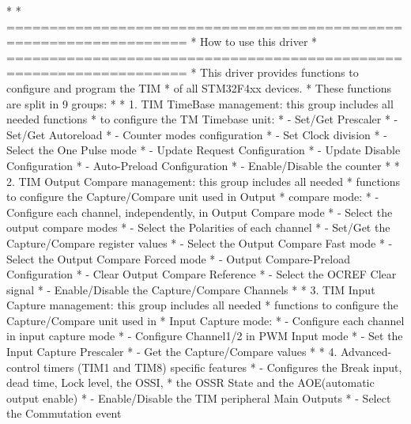 \begin{DoxyVerb}*  
*          ===================================================================
*                                 How to use this driver
*          ===================================================================
*          This driver provides functions to configure and program the TIM 
*          of all STM32F4xx devices.
*          These functions are split in 9 groups: 
*   
*          1. TIM TimeBase management: this group includes all needed functions 
*             to configure the TM Timebase unit:
*                   - Set/Get Prescaler
*                   - Set/Get Autoreload  
*                   - Counter modes configuration
*                   - Set Clock division  
*                   - Select the One Pulse mode
*                   - Update Request Configuration
*                   - Update Disable Configuration
*                   - Auto-Preload Configuration 
*                   - Enable/Disable the counter     
*                 
*          2. TIM Output Compare management: this group includes all needed 
*             functions to configure the Capture/Compare unit used in Output 
*             compare mode: 
*                   - Configure each channel, independently, in Output Compare mode
*                   - Select the output compare modes
*                   - Select the Polarities of each channel
*                   - Set/Get the Capture/Compare register values
*                   - Select the Output Compare Fast mode 
*                   - Select the Output Compare Forced mode  
*                   - Output Compare-Preload Configuration 
*                   - Clear Output Compare Reference
*                   - Select the OCREF Clear signal
*                   - Enable/Disable the Capture/Compare Channels    
*                   
*          3. TIM Input Capture management: this group includes all needed 
*             functions to configure the Capture/Compare unit used in 
*             Input Capture mode:
*                   - Configure each channel in input capture mode
*                   - Configure Channel1/2 in PWM Input mode
*                   - Set the Input Capture Prescaler
*                   - Get the Capture/Compare values      
*                   
*          4. Advanced-control timers (TIM1 and TIM8) specific features
*                   - Configures the Break input, dead time, Lock level, the OSSI,
*                      the OSSR State and the AOE(automatic output enable)
*                   - Enable/Disable the TIM peripheral Main Outputs
*                   - Select the Commutation event

\end{DoxyVerb}
